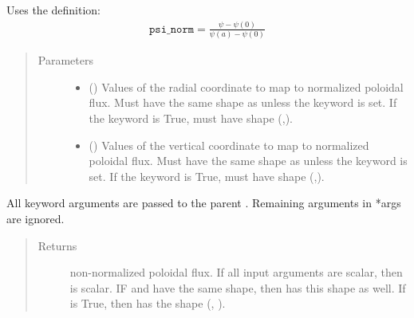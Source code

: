 \documentclass[letterpaper,10pt,english]{sphinxmanual}
\begin{document}
\begin{fulllineitems}
\begin{fulllineitems}
Uses the definition:
\begin{equation*}
\begin{split}\texttt{psi\_norm} = \frac{\psi - \psi(0)}{\psi(a) - \psi(0)}\end{split}
\end{equation*}\begin{quote}\begin{description}
\item[{Parameters}] \leavevmode\begin{itemize}
\item {} 
 () \textendash{} Values of the radial coordinate to
map to normalized poloidal flux.  Must have the same shape as
 unless the  keyword is set. If the 
keyword is True,  must have shape (,).

\item {} 
 () \textendash{} Values of the vertical coordinate to
map to normalized poloidal flux.  Must have the same shape as
 unless the  keyword is set. If the 
keyword is True,  must have shape (,).

\end{itemize}

\end{description}\end{quote}

All keyword arguments are passed to the parent
{\hyperref[\detokenize{eqtools:eqtools.core.Equilibrium.rz2psinorm}]{}}.
Remaining arguments in *args are ignored.
\begin{quote}\begin{description}
\item[{Returns}] \leavevmode
non-normalized poloidal flux.  If
all input arguments are scalar, then  is scalar.  IF  and 
have the same shape, then  has this shape as well.  If 
is True, then  has the shape (, ).


\end{description}
\end{quote}
\end{fulllineitems}
\end{fulllineitems}
\end{document}
